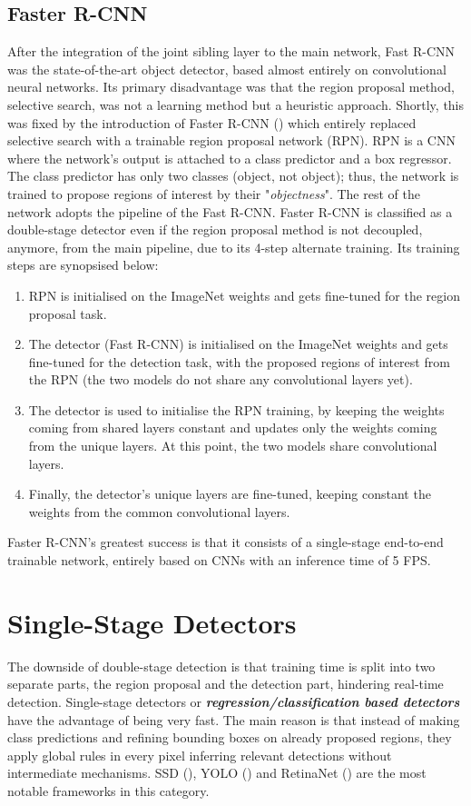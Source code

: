 \subsection{Faster R-CNN}
After the integration of the joint sibling layer to the main network, Fast R-CNN was the state-of-the-art object detector, based almost entirely on convolutional neural networks. Its primary disadvantage was that the region proposal method, selective search, was not a learning method but a heuristic approach. Shortly, this was fixed by the introduction of Faster R-CNN (\cite{ren2015faster}) which entirely replaced selective search with a trainable region proposal network (RPN). RPN is a CNN where the network's output is attached to a class predictor and a box regressor. The class predictor has only two classes (object, not object); thus, the network is trained to propose regions of interest by their "\textit{objectness}". The rest of the network adopts the pipeline of the Fast R-CNN. Faster R-CNN is classified as a double-stage detector even if the region proposal method is not decoupled, anymore, from the main pipeline, due to its 4-step alternate training. Its training steps are synopsised below:
 
\begin{enumerate}
  \item RPN is initialised on the ImageNet weights and gets fine-tuned for the region proposal task.
  \item The detector (Fast R-CNN) is initialised on the ImageNet weights and gets fine-tuned for the detection task, with the proposed regions of interest from the RPN (the two models do not share any convolutional layers yet).
  \item The detector is used to initialise the RPN training, by keeping the weights coming from shared layers constant and updates only the weights coming from the unique layers. At this point, the two models share convolutional layers.
  \item Finally, the detector's unique layers are fine-tuned, keeping constant the weights from the common convolutional layers.
\end{enumerate}

Faster R-CNN's greatest success is that it consists of a single-stage end-to-end trainable network, entirely based on CNNs with an inference time of 5 FPS.


\section{Single-Stage Detectors}
The downside of double-stage detection is that training time is split into two separate parts, the region proposal and the detection part, hindering real-time detection. Single-stage detectors or \textbf{\textit{regression/classification based detectors}} have the advantage of being very fast. The main reason is that instead of making class predictions and refining bounding boxes on already proposed regions, they apply global rules in every pixel inferring relevant detections without intermediate mechanisms. SSD (\cite{liu2016ssd}), YOLO (\cite{redmon2016you}) and RetinaNet (\cite{lin2017focal}) are the most notable frameworks in this category.
 
